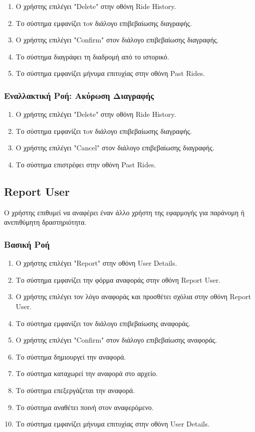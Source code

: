 \begin{enumerate}
    \item Ο χρήστης επιλέγει "Delete" στην οθόνη Ride History.
    \item Το σύστημα εμφανίζει τoν διάλογο επιβεβαίωσης διαγραφής.
    \item Ο χρήστης επιλέγει "Confirm" στον διάλογο επιβεβαίωσης διαγραφής.
    \item Το σύστημα διαγράφει τη διαδρομή από το ιστορικό.
    \item Το σύστημα εμφανίζει μήνυμα επιτυχίας στην οθόνη Past Rides.
\end{enumerate}

\subsubsection{Εναλλακτική Ροή: Ακύρωση Διαγραφής}

\begin{enumerate}
    \item Ο χρήστης επιλέγει "Delete" στην οθόνη Ride History.
    \item Το σύστημα εμφανίζει τoν διάλογο επιβεβαίωσης διαγραφής.
    \item Ο χρήστης επιλέγει "Cancel" στον διάλογο επιβεβαίωσης διαγραφής.
    \item Το σύστημα επιστρέφει στην οθόνη Past Rides.
\end{enumerate}

\subsection{Report User}

Ο χρήστης επιθυμεί να αναφέρει έναν άλλο χρήστη της εφαρμογής για παράνομη ή ανεπιθύμητη δραστηριότητα.

\subsubsection{Βασική Ροή}

\begin{enumerate}
    \item Ο χρήστης επιλέγει "Report" στην οθόνη User Details.
    \item Το σύστημα εμφανίζει την φόρμα αναφοράς στην οθόνη Report User.
    \item Ο χρήστης επιλέγει τον λόγο αναφοράς και προσθέτει σχόλια στην οθόνη Report User.
    \item Το σύστημα εμφανίζει τον διάλογο επιβεβαίωσης αναφοράς.
    \item Ο χρήστης επιλέγει "Confirm" στον διάλογο επιβεβαίωσης αναφοράς.
    \item Το σύστημα δημιουργεί την αναφορά.
    \item Το σύστημα καταχωρεί την αναφορά στο αρχείο.
    \item Το σύστημα επεξεργάζεται την αναφορά.
    \item Το σύστημα αναθέτει ποινή στον αναφερόμενο.
    \item Το σύστημα εμφανίζει μήνυμα επιτυχίας στην οθόνη User Details.
\end{enumerate}

